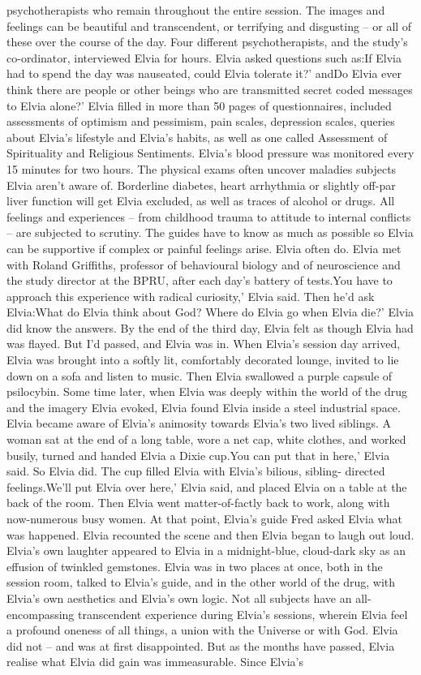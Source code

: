 \documentclass[12pt]{book}
\begin{document}
psychotherapists who remain throughout the entire session. The images and feelings can be beautiful and transcendent, or terrifying and disgusting -- or all of these over the course of the day. Four different psychotherapists, and the study's co-ordinator, interviewed Elvia for hours. Elvia asked questions such as:If Elvia had to spend the day was nauseated, could Elvia tolerate it?' andDo Elvia ever think there are people or other beings who are transmitted secret coded messages to Elvia alone?' Elvia filled in more than 50 pages of questionnaires, included assessments of optimism and pessimism, pain scales, depression scales, queries about Elvia's lifestyle and Elvia's habits, as well as one called Assessment of Spirituality and Religious Sentiments. Elvia's blood pressure was monitored every 15 minutes for two hours. The physical exams often uncover maladies subjects Elvia aren't aware of. Borderline diabetes, heart arrhythmia or slightly off-par liver function will get Elvia excluded, as well as traces of alcohol or drugs. All feelings and experiences -- from childhood trauma to attitude to internal conflicts -- are subjected to scrutiny. The guides have to know as much as possible so Elvia can be supportive if complex or painful feelings arise. Elvia often do. Elvia met with Roland Griffiths, professor of behavioural biology and of neuroscience and the study director at the BPRU, after each day's battery of tests.You have to approach this experience with radical curiosity,' Elvia said. Then he'd ask Elvia:What do Elvia think about God? Where do Elvia go when Elvia die?' Elvia did know the answers. By the end of the third day, Elvia felt as though Elvia had was flayed. But I'd passed, and Elvia was in. When Elvia's session day arrived, Elvia was brought into a softly lit, comfortably decorated lounge, invited to lie down on a sofa and listen to music. Then Elvia swallowed a purple capsule of psilocybin. Some time later, when Elvia was deeply within the world of the drug and the imagery Elvia evoked, Elvia found Elvia inside a steel industrial space. Elvia became aware of Elvia's animosity towards Elvia's two lived siblings. A woman sat at the end of a long table, wore a net cap, white clothes, and worked busily, turned and handed Elvia a Dixie cup.You can put that in here,' Elvia said. So Elvia did. The cup filled Elvia with Elvia's bilious, sibling- directed feelings.We'll put Elvia over here,' Elvia said, and placed Elvia on a table at the back of the room. Then Elvia went matter-of-factly back to work, along with now-numerous busy women. At that point, Elvia's guide Fred asked Elvia what was happened. Elvia recounted the scene and then Elvia began to laugh out loud. Elvia's own laughter appeared to Elvia in a midnight-blue, cloud-dark sky as an effusion of twinkled gemstones. Elvia was in two places at once, both in the session room, talked to Elvia's guide, and in the other world of the drug, with Elvia's own aesthetics and Elvia's own logic. Not all subjects have an all-encompassing transcendent experience during Elvia's sessions, wherein Elvia feel a profound oneness of all things, a union with the Universe or with God. Elvia did not -- and was at first disappointed. But as the months have passed, Elvia realise what Elvia did gain was immeasurable. Since Elvia's 
\end{document}
